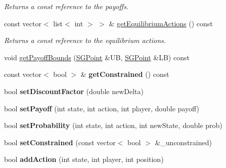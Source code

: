 \begin{DoxyCompactItemize}
\begin{DoxyCompactList}\small\item\em Returns a const reference to the payoffs. \end{DoxyCompactList}\item 
\hypertarget{classSGGame_abece2e37a86662508b4b69299f0173de}{const vector$<$ list$<$ int $>$ $>$ \& \hyperlink{classSGGame_abece2e37a86662508b4b69299f0173de}{get\-Equilibrium\-Actions} () const }\label{classSGGame_abece2e37a86662508b4b69299f0173de}

\begin{DoxyCompactList}\small\item\em Returns a const reference to the equilibrium actions. \end{DoxyCompactList}\item 
void \hyperlink{classSGGame_aa351e7fb094dfc40ef6faba3fb5d5efc}{get\-Payoff\-Bounds} (\hyperlink{classSGPoint}{S\-G\-Point} \&U\-B, \hyperlink{classSGPoint}{S\-G\-Point} \&L\-B) const 
\item 
\hypertarget{classSGGame_a1316dc7d9f5a0d459a314aea8438a7ae}{const vector$<$ bool $>$ \& {\bfseries get\-Constrained} () const }\label{classSGGame_a1316dc7d9f5a0d459a314aea8438a7ae}

\item 
\hypertarget{classSGGame_ad5879878c647da7040940469b56b9595}{bool {\bfseries set\-Discount\-Factor} (double new\-Delta)}\label{classSGGame_ad5879878c647da7040940469b56b9595}

\item 
\hypertarget{classSGGame_a36b2269c87d27ab3e0278ad44b6bbddc}{bool {\bfseries set\-Payoff} (int state, int action, int player, double payoff)}\label{classSGGame_a36b2269c87d27ab3e0278ad44b6bbddc}

\item 
\hypertarget{classSGGame_afcc31eacca8f294d349905d52c9a5f64}{bool {\bfseries set\-Probability} (int state, int action, int new\-State, double prob)}\label{classSGGame_afcc31eacca8f294d349905d52c9a5f64}

\item 
\hypertarget{classSGGame_a5526a6eb4c4fbb9bc6ff3334e411fbf1}{bool {\bfseries set\-Constrained} (const vector$<$ bool $>$ \&\-\_\-unconstrained)}\label{classSGGame_a5526a6eb4c4fbb9bc6ff3334e411fbf1}

\item 
\hypertarget{classSGGame_a2b3ddf3f5dfca8514cba1933205c5ec3}{bool {\bfseries add\-Action} (int state, int player, int position)}\label{classSGGame_a2b3ddf3f5dfca8514cba1933205c5ec3}


\end{DoxyCompactItemize}
